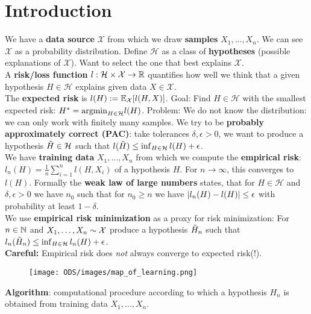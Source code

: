 \section{Introduction}
We have a \textbf{data source} $\mathcal{X}$ from which we draw \textbf{samples} $X_1, \dots, X_n$. We can see $\mathcal{X}$ as a probability distribution. Define $\mathcal{H}$ as a class of \textbf{hypotheses} (possible explanations of $\mathcal{X}$). Want to select the one that best explains $\mathcal{X}$. \\
A \textbf{risk/loss function} $l : \mathcal{H} \times \mathcal{X} \rightarrow \mathbb{R}$ quantifies how well we think that a given hypothesis $H \in \mathcal{H}$ explains given data $X \in \mathcal{X}$. \\
The \textbf{expected risk} is $l(H) := \mathbb{E}_{\mathcal{X}}[l(H, X)]$. Goal: Find $H \in \mathcal{H}$ with the smallest expected risk: $H^* = \mathrm{argmin}_{H \in \mathcal{H}} l(H)$.
Problem: We do not know the distribution: we can only work with finitely many samples. We try to be \textbf{probably approximately correct (PAC)}: take tolerances $\delta, \epsilon > 0$, we want to produce a hypothesis $\Tilde{H} \in \mathcal{H}$ such that $l(\Tilde{H}) \leq \inf_{H \in \mathcal{H}}{l(H)} + \epsilon$.\\
We have \textbf{training data} $X_1, \dots, X_n$ from which we compute the \textbf{empirical risk}: $l_n(H) = \frac{1}{n}\sum_{i=1}^n{l(H, X_i)}$ of a hypothesis $H$. For $n \rightarrow \infty$, this converges to $l(H)$. Formally the \textbf{weak law of large numbers} states, that for $H \in \mathcal{H}$ and $\delta, \epsilon > 0$ we have $n_0$ such that for $n_0 \geq n$ we have $\abs{l_n(H) - l(H)} \leq \epsilon$ with probability at least $1 - \delta$. \\
We use \textbf{empirical risk minimization} as a proxy for risk minimization: For $n \in \mathbb{N}$ and $X_1, \dots, X_n \sim \mathcal{X}$ produce a hypothesis $\Tilde{H}_n$ such that $l_n(\Tilde{H}_n) \leq \inf_{H \in \mathcal{H}}{l_n(H)} + \epsilon$. \\
\textbf{Careful:} Empirical risk does \textit{not} always converge to expected risk(!).
\begin{wrapfigure}[18]{l}{0.12\textwidth}
\texttt{[image: ODS/images/map\_of\_learning.png]}
\end{wrapfigure}
\textbf{Algorithm}: computational procedure according to which a hypothesis $H_n$ is obtained from training data $X_1, \dots, X_n$. \\
